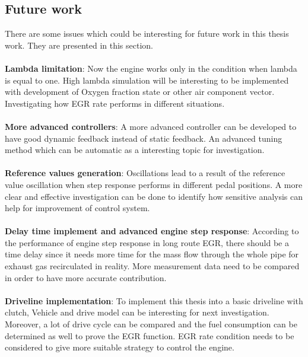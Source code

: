 \subsection*{Future work}
There are some issues which could be interesting for future work in this thesis work. They are presented in this section.\\
 \\
\textbf{Lambda limitation}: Now the engine works only in the condition when lambda is equal to one. High lambda simulation will be interesting to be implemented with development of Oxygen fraction state or other air component vector. Investigating how EGR rate performs in different situations.\\
\\
\textbf{More advanced controllers}: A more advanced controller can be developed to have good dynamic feedback instead of static feedback. An advanced tuning method which can be automatic as a interesting topic for investigation.  \\
\\
\textbf{Reference values generation}: Oscillations lead to a result of the reference value oscillation when step response performs in different pedal positions. A more clear and effective investigation can be done to identify how sensitive analysis can help for improvement of control system.  \\
\\
\textbf{Delay time implement and advanced engine step response}: According to the performance of engine step response in long route EGR, there should be a time delay since it needs more time for the mass flow through the whole pipe for exhaust gas recirculated in reality. More measurement data need to be compared in order to have more accurate contribution. \\
\\
\textbf{Driveline implementation}: To implement this thesis into a basic driveline with clutch, Vehicle and drive model can be interesting for next investigation. Moreover, a lot of drive cycle can be compared and the fuel consumption can be determined as well to prove the EGR function. EGR rate condition needs to be considered to give more suitable strategy to control the engine. \\